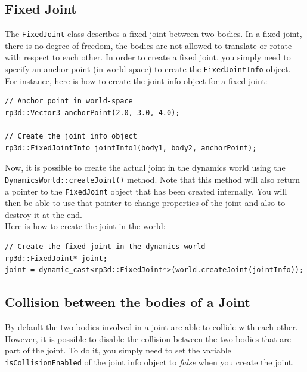 \documentclass[a4paper,12pt]{article}
\begin{document}
    \subsection{Fixed Joint}

    The \texttt{FixedJoint} class describes a fixed joint between two bodies. In a fixed joint, there is no degree of freedom, the bodies are not allowed to translate
    or rotate with respect to each other. In order to create a fixed joint, you simply need to specify an anchor point (in world-space) to create the \texttt{FixedJointInfo}
    object. \\

    For instance, here is how to create the joint info object for a fixed joint: \\

    \begin{lstlisting}
// Anchor point in world-space
rp3d::Vector3 anchorPoint(2.0, 3.0, 4.0);

// Create the joint info object
rp3d::FixedJointInfo jointInfo1(body1, body2, anchorPoint);
  \end{lstlisting}

    \vspace{0.6cm}

    Now, it is possible to create the actual joint in the dynamics world using the \texttt{DynamicsWorld::createJoint()} method.
    Note that this method will also return a pointer to the \texttt{FixedJoint} object that has been created internally. You will then
    be able to use that pointer to change properties of the joint and also to destroy it at the end. \\

    Here is how to create the joint in the world: \\

    \begin{lstlisting}
// Create the fixed joint in the dynamics world
rp3d::FixedJoint* joint;
joint = dynamic_cast<rp3d::FixedJoint*>(world.createJoint(jointInfo));
  \end{lstlisting}

    \subsection{Collision between the bodies of a Joint}

    By default the two bodies involved in a joint are able to collide with each other. However, it is possible to disable the collision between the two bodies that are part
    of the joint. To do it, you simply need to set the variable \texttt{isCollisionEnabled} of the joint info object to \emph{false} when you create the joint. \\
\end{document}
